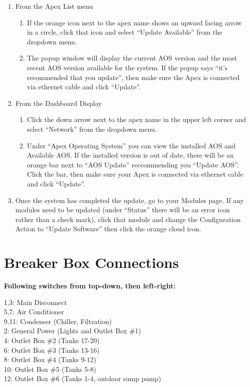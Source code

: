 \documentclass[]{book}
\providecommand{\tightlist}{%
  \setlength{\itemsep}{0pt}\setlength{\parskip}{0pt}}
\begin{document}
\begin{enumerate}
\def\labelenumi{\arabic{enumi}.}
\tightlist
\item
  From the Apex List menu

  \begin{enumerate}
  \def\labelenumii{\arabic{enumii}.}
  \tightlist
  \item
    If the orange icon next to the apex name shows an upward facing
    arrow in a circle, click that icon and select ``Update Available''
    from the dropdown menu.
  \item
    The popup window will display the current AOS version and the most
    recent AOS version available for the system. If the popup says
    ``it's recommended that you update'', then make sure the Apex is
    connected via ethernet cable and click ``Update''.
  \end{enumerate}
\item
  From the Dashboard Display

  \begin{enumerate}
  \def\labelenumii{\arabic{enumii}.}
  \tightlist
  \item
    Click the down arrow next to the apex name in the upper left corner
    and select ``Network'' from the dropdown menu.
  \item
    Under ``Apex Operating System'' you can view the installed AOS and
    Available AOS. If the installed version is out of date, there will
    be an orange bar next to ``AOS Update'' reccommending you ``Update
    AOS''. Click the bar, then make sure your Apex is connected via
    ethernet cable and click ``Update''.
  \end{enumerate}
\item
  Once the system has completed the update, go to your Modules page. If
  any modules need to be updated (under ``Status'' there will be an
  error icon rather than a check mark), click that module and change the
  Configuration Action to ``Update Software'' then click the orange
  cloud icon.
\end{enumerate}

\chapter{Breaker Box Connections}\label{breaker-box-connections}

\textbf{Following switches from top-down, then left-right:}

1,3: Main Disconnect\\
5,7: Air Conditioner\\
9,11: Condenser (Chiller, Filtration)\\
2: General Power (Lights and Outlet Box \#1)\\
4: Outlet Box \#2 (Tanks 17-20)\\
6: Outlet Box \#3 (Tanks 13-16)\\
8: Outlet Box \#4 (Tanks 9-12)\\
10: Outlet Box \#5 (Tanks 5-8)\\
12: Outlet Box \#6 (Tanks 1-4, outdoor sump pump)
\end{document}
